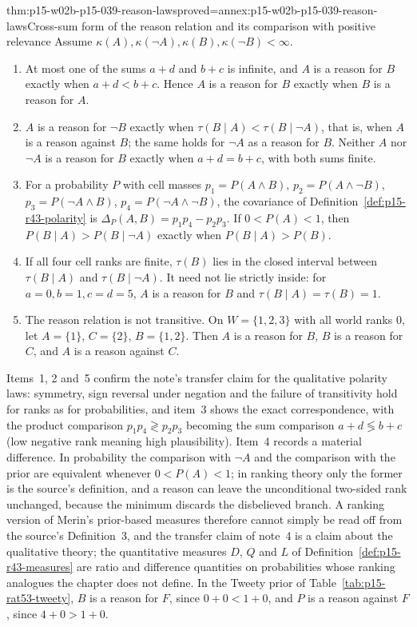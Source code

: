 \begin{hbtheorem}{thm:p15-w02b-p15-039-reason-laws}{proved=annex:p15-w02b-p15-039-reason-laws}{Cross-sum form of the reason relation and its comparison with positive relevance}
Assume \(\kappa(A),\kappa(\neg A),\kappa(B),\kappa(\neg B)<\infty\).
\begin{enumerate}
\item At most one of the sums \(a+d\) and \(b+c\) is infinite, and \(A\) is
 a reason for \(B\) exactly when \(a+d<b+c\).  Hence \(A\) is a reason for
 \(B\) exactly when \(B\) is a reason for \(A\).
\item \(A\) is a reason for \(\neg B\) exactly when
 \(\tau(B\mid A)<\tau(B\mid\neg A)\), that is, when \(A\) is a reason
 against \(B\); the same holds for \(\neg A\) as a reason for \(B\).
 Neither \(A\) nor \(\neg A\) is a reason for \(B\) exactly when
 \(a+d=b+c\), with both sums finite.
\item For a probability \(P\) with cell masses \(p_1=P(A\land B)\),
 \(p_2=P(A\land\neg B)\), \(p_3=P(\neg A\land B)\), \(p_4=P(\neg A\land\neg B)\),
 the covariance of Definition~\ref{def:p15-r43-polarity} is
 \(\Delta_P(A,B)=p_1p_4-p_2p_3\).  If \(0<P(A)<1\), then
 \(P(B\mid A)>P(B\mid\neg A)\) exactly when \(P(B\mid A)>P(B)\).
\item If all four cell ranks are finite, \(\tau(B)\) lies in the closed
 interval between \(\tau(B\mid A)\) and \(\tau(B\mid\neg A)\).  It need not
 lie strictly inside: for \(a=0,b=1,c=d=5\), \(A\) is a reason for \(B\) and
 \(\tau(B\mid A)=\tau(B)=1\).
\item The reason relation is not transitive.  On \(W=\{1,2,3\}\) with all
 world ranks \(0\), let \(A=\{1\}\), \(C=\{2\}\), \(B=\{1,2\}\).  Then
 \(A\) is a reason for \(B\), \(B\) is a reason for \(C\), and \(A\) is a
 reason against \(C\).
\end{enumerate}
\end{hbtheorem}

Items~1, 2 and~5 confirm the note's transfer claim for the qualitative
polarity laws: symmetry, sign reversal under negation and the failure of
transitivity hold for ranks as for probabilities, and item~3 shows the exact
correspondence, with the product comparison \(p_1p_4\gtrless p_2p_3\) becoming
the sum comparison \(a+d\lessgtr b+c\) (low negative rank meaning high
plausibility).  Item~4 records a material difference.  In probability the
comparison with \(\neg A\) and the comparison with the prior are equivalent
whenever \(0<P(A)<1\); in ranking theory only the former is the source's
definition, and a reason can leave the unconditional two-sided rank unchanged,
because the minimum discards the disbelieved branch.  A ranking version of
Merin's prior-based measures therefore cannot simply be read off from
the source's Definition~3, and the transfer claim of note~4 is a claim about the
qualitative theory; the quantitative measures \(D\), \(Q\) and \(L\) of
Definition~\ref{def:p15-r43-measures} are ratio and difference quantities on
probabilities whose ranking analogues the chapter does not define.
In the Tweety prior of Table~\ref{tab:p15-rat53-tweety}, \(B\) is a reason
for \(F\), since \(0+0<1+0\), and \(P\) is a reason against \(F\), since
\(4+0>1+0\).

